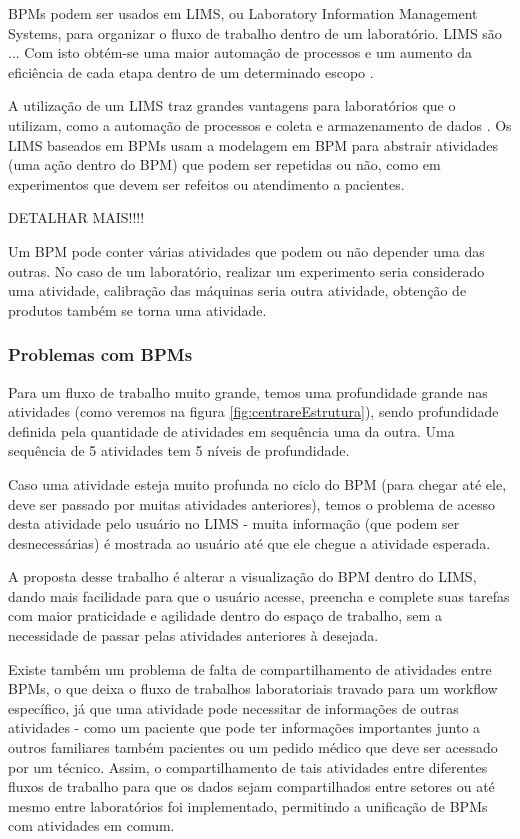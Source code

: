 BPMs podem ser usados em LIMS, ou Laboratory Information Management Systems, para organizar o fluxo de trabalho dentro de um laboratório. LIMS são ... Com isto obtém-se uma maior automação de processos e um aumento da eficiência de cada etapa dentro de um determinado escopo \cite{Key2011}.

A utilização de um LIMS traz grandes vantagens para laboratórios que o utilizam, como a automação de processos e coleta e armazenamento de dados \cite{Key2011}. Os LIMS baseados em BPMs usam a modelagem em BPM para abstrair atividades (uma ação dentro do BPM) que podem ser repetidas ou não, como em experimentos que devem ser refeitos ou atendimento a pacientes. 

DETALHAR MAIS!!!!

Um BPM pode conter várias atividades que podem ou não depender uma das outras. No caso de um laboratório, realizar um experimento seria considerado uma atividade, calibração das máquinas seria outra atividade, obtenção de produtos também se torna uma atividade.

\subsubsection*{Problemas com BPMs}
Para um fluxo de trabalho muito grande, temos uma profundidade grande nas atividades (como veremos na figura \ref{fig:centrareEstrutura}), sendo profundidade definida pela quantidade de atividades em sequência uma da outra. Uma sequência de 5 atividades tem 5 níveis de profundidade.

Caso uma atividade esteja muito profunda no ciclo do BPM (para chegar até ele, deve ser passado por muitas atividades anteriores), temos o problema de acesso desta atividade pelo usuário no LIMS - muita informação (que podem ser desnecessárias) é mostrada ao usuário até que ele chegue a atividade esperada.

A proposta desse trabalho é alterar a visualização do BPM dentro do LIMS, dando mais facilidade para que o usuário acesse, preencha e complete suas tarefas com maior praticidade e agilidade dentro do espaço de trabalho, sem a necessidade de passar pelas atividades anteriores à desejada.

Existe também um problema de falta de compartilhamento de atividades entre BPMs, o que deixa o fluxo de trabalhos laboratoriais travado para um workflow específico, já que uma atividade pode necessitar de informações de outras atividades - como um paciente que pode ter informações importantes junto a outros familiares também pacientes ou um pedido médico que deve ser acessado por um técnico. Assim, o compartilhamento de tais atividades entre diferentes fluxos de trabalho para que os dados sejam compartilhados entre setores ou até mesmo entre laboratórios foi implementado, permitindo a unificação de BPMs com atividades em comum.

